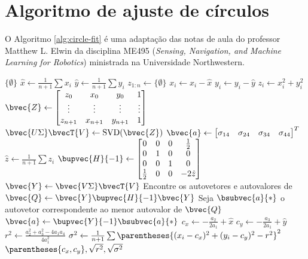 \section{Algoritmo de ajuste de círculos}
\label{annex:circle-fit}
O Algoritmo \ref{alg:circle-fit} é uma adaptação das notas de aula do 
professor Matthew L. Elwin da disciplina ME495 (\textit{Sensing, Navigation, and Machine Learning for Robotics}) \cite{matt-circle-fit} ministrada na 
Universidade Northwestern.
\begin{algorithm}[h]
  \caption{}
  \label{alg:circle-fit}
\begin{algorithmic}[1]
      \State \Return $\{\emptyset\}$
    \EndIf
    \State $\hat{x} \gets \frac{1}{n+1} \sum x_i$
    \State $\hat{y} \gets \frac{1}{n+1} \sum y_i$
    \State $z_{1:n} \gets \{ \emptyset \}$
      \State $x_i \gets x_i - \hat{x}$
      \State $y_i \gets y_i - \hat{y}$
      \State $z_i \gets x_i^2 + y_i^2$
    \EndFor
    \State $\displaystyle \bvec{Z} \gets \begin{bmatrix}
      z_0 & x_0 & y_0 & 1 \\ 
      \vdots & \vdots & \vdots & \vdots \\
      z_{n+1} & x_{n+1} & y_{n+1} & 1 \\ 
    \end{bmatrix}$
    \State $\bvec{U \Sigma} \bvecT{V} \gets \SVD(\bvec{Z})$
      \State $ \bvec{a}\gets \begin{bmatrix}\sigma_{14}  & \sigma_{24} & \sigma_{34} & \sigma_{44} \end{bmatrix}^T$
    \Else
      \State $\hat{z} \gets \frac{1}{n+1} \sum z_i$
      \State $\displaystyle \bupvec{H}{-1} \gets \begin{bmatrix}
        0 & 0 & 0 & \frac{1}{2}\\
        0 & 1 & 0 & 0\\
        0 & 0 & 1 & 0\\
        \frac{1}{2} & 0 & 0 & -2\hat{z}
      \end{bmatrix}$
      \State $\bvec{Y} \gets \bvec{V \Sigma}\bvecT{V}$
      \State Encontre os autovetores e autovalores de $\bvec{Q} \gets \bvec{Y}\bupvec{H}{-1}\bvec{Y}$
      \State Seja $\bsubvec{a}{*}$ o autovetor correspondente ao menor autovalor de $\bvec{Q}$
      \State $\bvec{a} \gets \bupvec{Y}{-1} \bsubvec{a}{*}$
    \EndIf
    \State $c_x \gets -\frac{a_2}{2 a_1} + \hat{x}$
    \State $c_y \gets -\frac{a_3}{2 a_1} + \hat{y}$
    \State $r^2 \gets \frac{a_2^2 + a_3^2 - 4 a_1 a_4}{4 a_1^2}$
    \State $\sigma^2 \gets \frac{1}{n+1} \sum \parentheses{(x_i - c_x)^2 + (y_i - c_y)^2 -r^2}^2$
    \State \Return $\parentheses{c_x, c_y}, \sqrt{r^2}, \sqrt{\sigma^2}$
  \EndProcedure
\end{algorithmic}
\end{algorithm}
